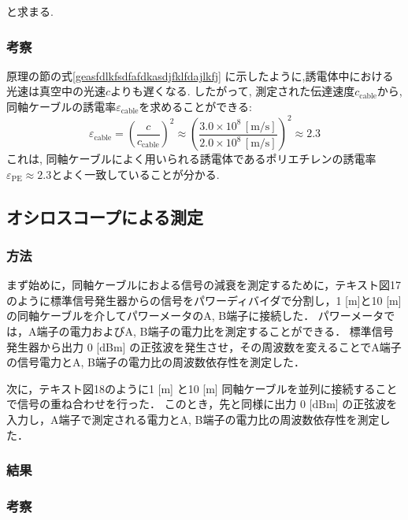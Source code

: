 \documentclass[uplatex,dvipdfmx,a4j,12pt]{jsarticle}
\begin{document}
と求まる.







\subsubsection{考察}


原理の節の式\ref{geasfdlkfsdfafdkasdjfklfdajlkfj} に示したように,誘電体中における光速は真空中の光速$c$よりも遅くなる.
したがって, 測定された伝達速度$c_\mathrm{cable}$から, 同軸ケーブルの誘電率$\varepsilon_\mathrm{cable}$を求めることができる:
\begin{equation}
  \varepsilon_\mathrm{cable} = \left(\frac{c}{c_\mathrm{cable}}\right)^2 \approx \left(\frac{3.0 \times 10^8\,\mathrm{[m/s]}}{2.0 \times 10^8\,\mathrm{[m/s]}}\right)^2 \approx 2.3
\end{equation}
これは, 同軸ケーブルによく用いられる誘電体であるポリエチレンの誘電率$\varepsilon_\mathrm{PE} \approx 2.3$とよく一致していることが分かる.



\subsection{オシロスコープによる測定}
\subsubsection{方法}
まず始めに，同軸ケーブルにおよる信号の減衰を測定するために，テキスト図17のように標準信号発生器からの信号をパワーディバイダで分割し，1 [m]と10 [m]の同軸ケーブルを介してパワーメータのA, B端子に接続した．
パワーメータでは，A端子の電力およびA, B端子の電力比を測定することができる．
標準信号発生器から出力 0 [dBm] の正弦波を発生させ，その周波数を変えることでA端子の信号電力とA, B端子の電力比の周波数依存性を測定した．

次に，テキスト図18のように1 [m] と10 [m] 同軸ケーブルを並列に接続することで信号の重ね合わせを行った．
このとき，先と同様に出力 0 [dBm] の正弦波を入力し，A端子で測定される電力とA, B端子の電力比の周波数依存性を測定した．

\subsubsection{結果}

\subsubsection{考察}
\end{document}
